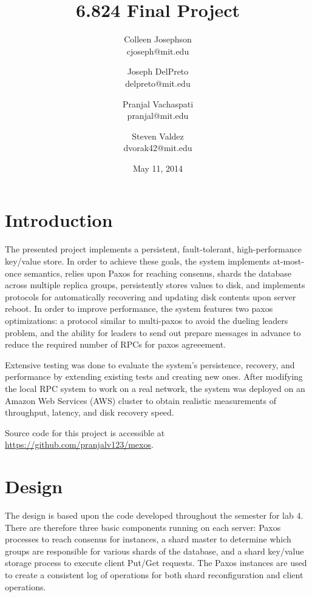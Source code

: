 \documentclass[letterpaper,10pt]{article}
\begin{document}
\title{\Large \bf 6.824 Final Project}
\author{
{\rm Colleen Josephson}\\
cjoseph@mit.edu
\and
{\rm Joseph DelPreto}\\
delpreto@mit.edu
\and
{\rm Pranjal Vachaspati}\\
pranjal@mit.edu
\and
{\rm Steven Valdez}\\
dvorak42@mit.edu
} %

\date{May 11, 2014}

\maketitle


\section{Introduction}
The presented project implements a persistent, fault-tolerant,
high-performance key/value store. In order to achieve these goals, the
system implements at-most-once semantics, relies upon Paxos for
reaching consenus, shards the database across multiple replica groups,
persistently stores values to disk, and implements protocols for
automatically recovering and updating disk contents upon server
reboot.  In order to improve performance, the system features two
paxos optimizations: a protocol similar to multi-paxos to avoid the
dueling leaders problem, and the ability for leaders to send out
prepare messages in advance to reduce the required number of RPCs for
paxos agreeement.

Extensive testing was done to evaluate the system's persistence,
recovery, and performance by extending existing tests and creating new
ones.  After modifying the local RPC system to work on a real network,
the system was deployed on an Amazon Web Services (AWS) cluster to
obtain realistic measurements of throughput, latency, and disk
recovery speed.

Source code for this project is accessible at \url{https://github.com/pranjalv123/mexos}.

\section{Design} \label{sec:design} The design is based upon the code
developed throughout the semester for lab 4.  There are therefore
three basic components running on each server: Paxos processes to
reach consenus for instances, a shard master to determine which groups
are responsible for various shards of the database, and a shard
key/value storage process to execute client Put/Get requests.  The
Paxos instances are used to create a consistent log of operations for
both shard reconfiguration and client operations.
\end{document}
